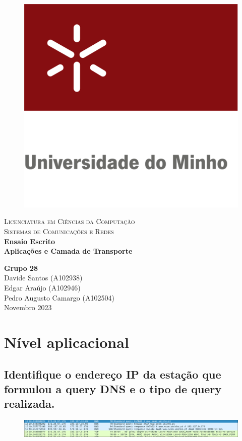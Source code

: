 \documentclass{article}
\begin{document}
\begin{titlepage}

\center %

\newcommand{\HRule}{\rule{\linewidth}{0.4mm}} %

\begin{figure}[h!]
    \centering
    \includegraphics[width=0.24\linewidth]{images/uniMinho.jpg}
\end{figure}

\textsc{\Large Licenciatura em Ciências da Computação}\\[0.4cm] %
\textsc{\Large Sistemas de Comunicações e Redes}\\[5cm]

{\Large\bfseries Ensaio Escrito}\\[0.5cm]
{\LARGE \bfseries Aplicações e Camada de Transporte} %


\vspace{5cm} %
{\bfseries Grupo 28} \\ \vspace{3mm}
Davide Santos (A102938) \\ \vspace{3mm}
Edgar Araújo (A102946) \\ \vspace{3mm}
Pedro Augusto Camargo (A102504) \\ \vspace{3mm}
\vspace{0.2cm}
{Novembro 2023}\\[0.2cm] %

\vfill %
\end{titlepage}

\tableofcontents
\pagebreak

\section{Nível aplicacional}
\subsection{Identifique o endereço IP da estação que formulou a query DNS e o tipo de query realizada.}
\begin{figure}[h!]
    \centering
    \includegraphics[width=1\linewidth]{images/dns.png}
\end{figure}
\end{document}
